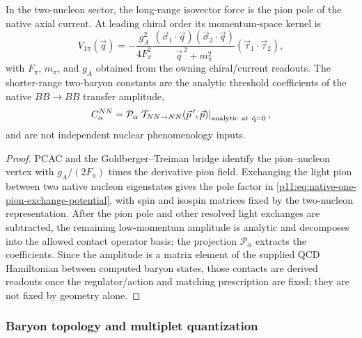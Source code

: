 \documentclass[12pt,a4paper]{article}
\begin{document}
\begin{theorem}
\label{p11:thm:native-one-pion-exchange-nuclear-boundary}
In the two-nucleon sector, the long-range isovector force is the pion pole of
the native axial current.  At leading chiral order its momentum-space kernel is
\begin{equation}
\label{p11:eq:native-one-pion-exchange-potential}
V_{1\pi}(\vec q)
=
-\frac{g_A^2}{4F_\pi^2}
\frac{(\vec\sigma_1\!\cdot\!\vec q)(\vec\sigma_2\!\cdot\!\vec q)}
{\vec q^{\,2}+m_\pi^2}
(\vec\tau_1\!\cdot\!\vec\tau_2),
\end{equation}
with \(F_\pi\), \(m_\pi\), and \(g_A\) obtained from the owning chiral/current readouts.  The shorter-range two-baryon constants are the analytic threshold
coefficients of the native \(BB\to BB\) transfer amplitude,
\begin{equation}
\label{p11:eq:native-nuclear-contact-readouts}
C_\alpha^{NN}
=
\mathcal P_\alpha
\left.
\mathcal T_{NN\to NN}(\vec p\,',\vec p)
\right|_{\rm analytic\ at\ \vec q=0},
\end{equation}
and are not independent nuclear phenomenology inputs.
\end{theorem}
\begin{proof}
PCAC and the Goldberger--Treiman bridge identify the pion--nucleon vertex with
\(g_A/(2F_\pi)\) times the derivative pion field.  Exchanging
the light pion between two native nucleon eigenstates gives the pole factor in
\eqref{p11:eq:native-one-pion-exchange-potential}, with spin and isospin matrices
fixed by the two-nucleon representation.  After the pion pole and other resolved
light exchanges are subtracted, the remaining low-momentum amplitude is analytic
and decomposes into the allowed contact operator basis; the projection
\(\mathcal P_\alpha\) extracts the coefficients.  Since the amplitude is a
matrix element of the supplied QCD Hamiltonian between computed baryon states, those contacts are derived readouts once the regulator/action and matching prescription are fixed; they are not fixed by geometry alone.
\end{proof}



\subsubsection{Baryon topology and multiplet quantization}
\label{p11:subsec:baryon-topology-multiplet-quantization}
\end{document}
